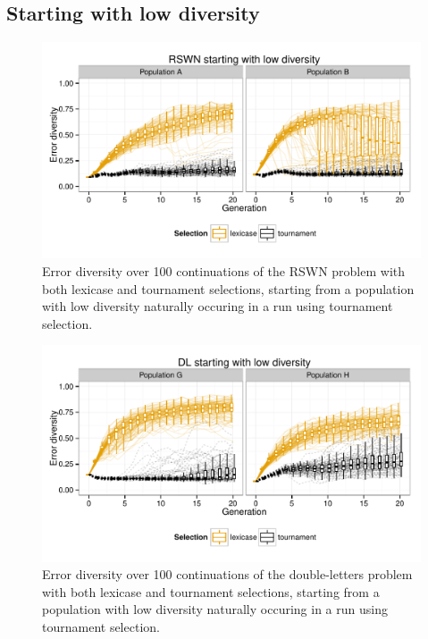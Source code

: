 \documentclass{sig-alternate-05-2015}
\begin{document}
\subsection{Starting with low diversity}
\label{sec:lowDiversityResults}

\begin{figure}
	\includegraphics{../figures/RSWN_low_diversity}
	\vspace{-1 cm}
	\caption{Error diversity over 100 continuations of the RSWN problem with both lexicase and tournament selections, starting from a population with low diversity  naturally occuring in a run using tournament selection.}
	\label{fig:RSWNlowDiversity}
\end{figure}

\begin{figure}
	\includegraphics{../figures/DL_low_diversity}
	\vspace{-1 cm}
	\caption{Error diversity over 100 continuations of the double-letters problem with both lexicase and tournament selections, starting from a population with low diversity naturally occuring in a run using tournament selection.}
	\label{fig:DLlowDiversity}
\end{figure}
\end{document}
